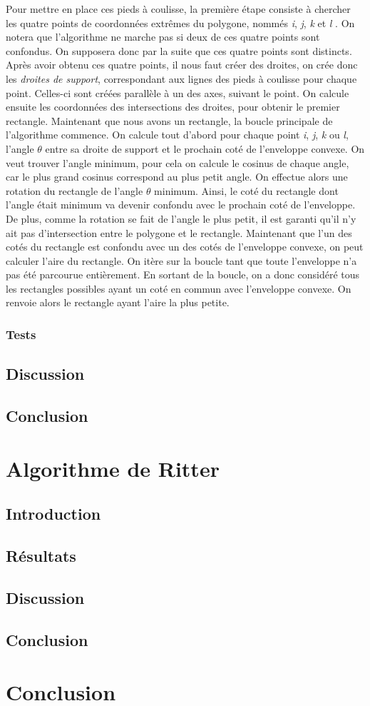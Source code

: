\documentclass[12pt]{report}
\begin{document}
Pour mettre en place ces pieds à coulisse, la première étape consiste à chercher les quatre points de coordonnées extrêmes du polygone, nommés \emph{i}, \emph{j}, \emph{k} et \emph{l} . On notera que l'algorithme ne marche pas si deux de ces quatre points sont confondus. On supposera donc par la suite que ces quatre points sont distincts. Après avoir obtenu ces quatre points, il nous faut créer des droites, on crée donc les \emph{droites de support}, correspondant aux lignes des pieds à coulisse pour chaque point. Celles-ci sont créées parallèle à un des axes, suivant le point. On calcule ensuite les coordonnées des intersections des droites, pour obtenir le premier rectangle. Maintenant que nous avons un rectangle, la boucle principale de l'algorithme commence. On calcule tout d'abord pour chaque point \emph{i}, \emph{j}, \emph{k} ou \emph{l}, l'angle $\theta$ entre sa droite de support et le prochain coté de l'enveloppe convexe. On veut trouver l'angle minimum, pour cela on calcule le cosinus de chaque angle, car le plus grand cosinus correspond au plus petit angle. On effectue alors une rotation du rectangle de l'angle $\theta$ minimum. Ainsi, le coté du rectangle dont l'angle était minimum va devenir confondu avec le prochain coté de l'enveloppe. De plus, comme la rotation se fait de l'angle le plus petit, il est garanti qu'il n'y ait pas d'intersection entre le polygone et le rectangle. Maintenant que l'un des cotés du rectangle est confondu avec un des cotés de l'enveloppe convexe, on peut calculer l'aire du rectangle. On itère sur la boucle tant que toute l'enveloppe n'a pas été parcourue entièrement. En sortant de la boucle, on a donc considéré tous les rectangles possibles ayant un coté en commun avec l'enveloppe convexe. On renvoie alors le rectangle ayant l'aire la plus petite.

\subsection{Tests}
\section{Discussion}
\section{Conclusion}
\chapter{Algorithme de Ritter}
\section{Introduction}
\section{Résultats}
\section{Discussion}
\section{Conclusion}
\chapter{Conclusion}
\end{document}
